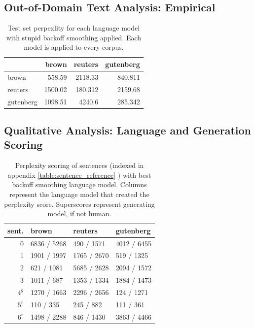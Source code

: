 \documentclass[11pt,a4paper]{article}
\begin{document}
\subsection{Out-of-Domain Text Analysis: Empirical}%
\label{sec:out_domain_text_analysis_empirical}


\begin{table}[h]
\begin{tabular}{lrrr}
\hline
           &   brown &   reuters &   gutenberg \\
\hline
 brown     &  558.59 &  2118.33  &     840.811 \\
 reuters   & 1500.02 &   180.312 &    2159.68  \\
 gutenberg & 1098.51 &  4240.6   &     285.342 \\
\hline
\end{tabular}
\caption{Test set perpexlity for each language model with
  stupid backoff smoothing applied. Each model is applied to 
every corpus.}
\label{table:backoff_test_perp}
\end{table}


\subsection{Qualitative Analysis: Language and Generation Scoring}
\label{sub:out_domain_text_analysis_qualitative}



\begin{table}
\begin{tabular}{rlll}
\hline
 sent.   & brown       & reuters     & gutenberg   \\
\hline
  0 & 6836 / 5268 & 490 / 1571  & 4012 / 6455 \\
  1 & 1901 / 1997 & 1765 / 2670 & 519 / 1325  \\
  2 & 621 / 1081  & 5685 / 2628 & 2094 / 1572 \\
  3 & 1011 / 687  & 1353 / 1334 & 1884 / 1473 \\
  $4^g$ & 1270 / 1663 & 2296 / 2656 & 124 / 1271  \\
  $5^r$ & 110 / 335   & 245 / 882   & 111 / 361   \\
  $6^r$ & 1498 / 2288 & 846 / 1430  & 3863 / 4466 \\
\hline
\end{tabular}
\caption{Perplexity scoring of sentences (indexed in appendix \ref{table:sentence_reference} ) with best
  backoff smoothing language model. Columns represent the language model that
created the perplexity score. Superscores represent generating model, if not human.}
\label{table:sentence_scoring}
\end{table}
\end{document}
